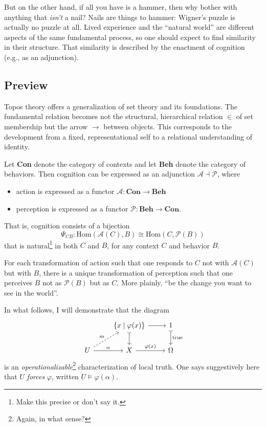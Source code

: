 \documentclass{article}
\begin{document}
But on the other hand, if all you have is a hammer, then why bother with anything that \emph{isn't} a nail? Nails are things to hammer: Wigner's puzzle is actually no puzzle at all. Lived experience and the ``natural world'' are different aspects of the same fundamental process, so one should expect to find similarity in their structure. That similarity is described by the enactment of cognition (e.g., as an adjunction).

\subsection{Preview}

Topos theory offers a generalization of set theory and its foundations. The fundamental relation becomes not the structural, hierarchical relation $\in$ of set membership but the arrow $\to$ between objects. This corresponds to the development from a fixed, representational self to a relational understanding of identity.

Let \textbf{Con} denote the category of contexts and let \textbf{Beh} denote the category of behaviors. Then cognition can be expressed as an adjunction $\mathcal{A} \dashv \mathcal{P}$, where

\begin{itemize}
    \item action is expressed as a functor $\mathcal{A} \colon \textbf{Con} \to \textbf{Beh}$
    \item perception is expressed as a functor $\mathcal{P} \colon \textbf{Beh} \to \textbf{Con}$.
\end{itemize}

That is, cognition consists of a bijection
\[
    \Psi_{CB} \colon \text{Hom} ( \mathcal{A}(C), B ) \cong \text{Hom}(C, \mathcal{P}(B))
\]
that is natural\footnote{Make this precise or don't say it.} in both $C$ and $B$, for any context $C$ and behavior $B$.

For each transformation of action such that one responds to $C$ not with $\mathcal{A}(C)$ but with $B$, there is a unique transformation of perception such that one perceives $B$ not as $\mathcal{P}(B)$ but as $C$. More plainly, ``be the change you want to see in the world''.

In what follows, I will demonstrate that the diagram
\[
    \begin{tikzcd}
        & \{ x \mid \varphi(x) \}  \arrow[r] \arrow[d, tail] & 1 \arrow[d, tail, "\text{true}"] \\
        U \arrow[r, "\alpha"] \arrow[ru, dashed, "m"] & X \arrow[r, "\varphi(x)"] & \Omega
    \end{tikzcd}
\]
is an \emph{operationalizable}\footnote{Again, in what sense?} characterization of local truth. One says suggestively here that $U$ \emph{forces} $\varphi$, written $U \vDash \varphi(\alpha)$.
\end{document}
